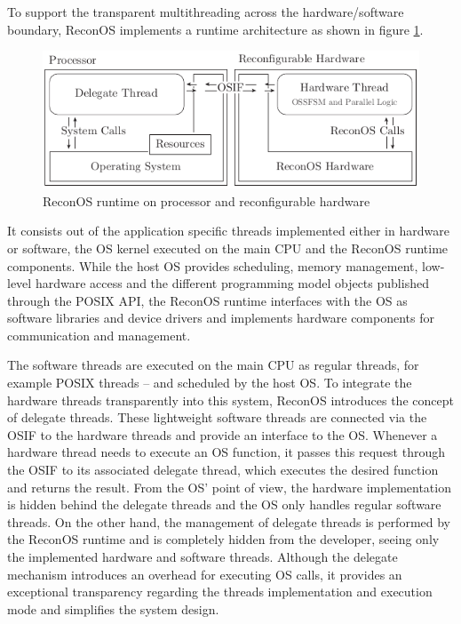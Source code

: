 To support the transparent multithreading across the hardware/software
boundary, ReconOS implements a runtime architecture as shown in figure
\ref{fig:reconos_runtime}.
\begin{figure}[tb]
	\centering
	\includegraphics{../figures/reconos_hwt}
	\caption{ReconOS runtime on processor and reconfigurable hardware}
	\label{fig:reconos_runtime}
\end{figure}
It consists out of the application specific threads implemented either in
hardware or software, the \ac{OS} kernel executed on the main \ac{CPU} and the
ReconOS runtime components. While the host \ac{OS} provides scheduling, memory
management, low-level hardware access and the different programming model
objects published through the \ac{POSIX} API, the ReconOS runtime interfaces
with the \ac{OS} as software libraries and device drivers and implements
hardware components for communication and management.

The software threads are executed on the main \ac{CPU} as regular threads, for
example \ac{POSIX} threads -- and scheduled by the host \ac{OS}. To integrate
the hardware threads transparently into this system, ReconOS introduces the
concept of delegate threads. These lightweight software threads are connected
via the \ac{OSIF} to the hardware threads and provide an interface to the
\ac{OS}. Whenever a hardware thread needs to execute an \ac{OS} function, it
passes this request through the \ac{OSIF} to its associated delegate thread,
which executes the desired function and returns the result. From the \ac{OS}'
point of view, the hardware implementation is hidden behind the delegate
threads and the \ac{OS} only handles regular software threads. On the other
hand, the management of delegate threads is performed by the ReconOS runtime
and is completely hidden from the developer, seeing only the implemented
hardware and software threads. Although the delegate mechanism introduces an
overhead for executing \ac{OS} calls, it provides an exceptional transparency
regarding the threads implementation and execution mode and simplifies the
system design.

